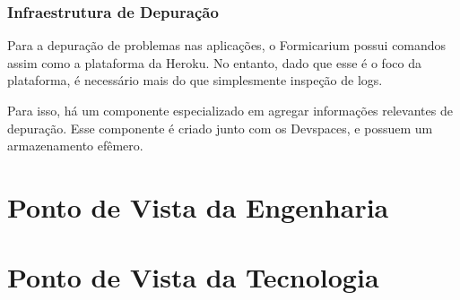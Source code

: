         	\subsubsection{Infraestrutura de Depuração}
        	    Para a depuração de problemas nas aplicações, o Formicarium possui comandos assim como a plataforma da Heroku. No entanto, dado que esse é o foco da plataforma, é necessário mais do que simplesmente inspeção de logs.
        	    
        	    Para isso, há um componente especializado em agregar informações relevantes de depuração. Esse componente é criado junto com os Devspaces, e possuem um armazenamento efêmero.
        	    
    	        
	\section{Ponto de Vista da Engenharia}
	    
	\section{Ponto de Vista da Tecnologia}